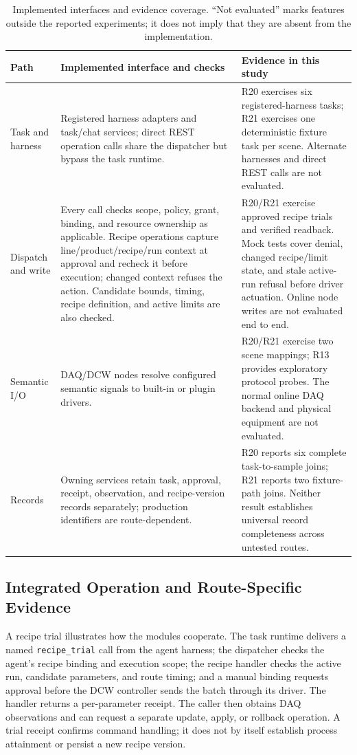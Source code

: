 \begin{table}[!t]
\centering
\caption{Implemented interfaces and evidence coverage. “Not evaluated” marks
features outside the reported experiments; it does not imply that they are
absent from the implementation.}
\label{tab:coverage}
\footnotesize
\setlength{\tabcolsep}{3pt}
\begin{tabularx}{\textwidth}{@{}p{2.0cm}X X@{}}
\toprule
Path & Implemented interface and checks & Evidence in this study \\
\midrule
Task and harness & Registered harness adapters and task/chat services; direct REST operation calls share the dispatcher but bypass the task runtime. & R20 exercises six registered-harness tasks; R21 exercises one deterministic fixture task per scene. Alternate harnesses and direct REST calls are not evaluated. \\
Dispatch and write & Every call checks scope, policy, grant, binding, and resource ownership as applicable. Recipe operations capture line/product/recipe/run context at approval and recheck it before execution; changed context refuses the action. Candidate bounds, timing, recipe definition, and active limits are also checked. & R20/R21 exercise approved recipe trials and verified readback. Mock tests cover denial, changed recipe/limit state, and stale active-run refusal before driver actuation. Online node writes are not evaluated end to end. \\
Semantic I/O & DAQ/DCW nodes resolve configured semantic signals to built-in or plugin drivers. & R20/R21 exercise two scene mappings; R13 provides exploratory protocol probes. The normal online DAQ backend and physical equipment are not evaluated. \\
Records & Owning services retain task, approval, receipt, observation, and recipe-version records separately; production identifiers are route-dependent. & R20 reports six complete task-to-sample joins; R21 reports two fixture-path joins. Neither result establishes universal record completeness across untested routes. \\
\bottomrule
\end{tabularx}
\end{table}

\subsection{Integrated Operation and Route-Specific Evidence}
\label{sec:tasklifecycle}
A recipe trial illustrates how the modules cooperate. The task runtime
delivers a named \texttt{recipe\_trial} call from the agent harness; the
dispatcher checks the agent's recipe binding and execution scope; the recipe
handler checks the active run, candidate parameters, and route timing; and a
manual binding requests approval before the DCW controller sends the batch
through its driver. The handler returns a per-parameter receipt. The caller
then obtains DAQ observations and can request a separate update, apply, or
rollback operation. A trial receipt confirms command handling; it does not
by itself establish process attainment or persist a new recipe version.

